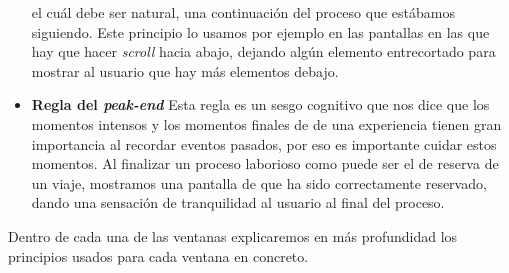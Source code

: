 \begin{itemize}
            el cuál debe ser natural, una continuación del proceso que estábamos siguiendo. Este principio lo usamos por ejemplo en las pantallas en las que hay que hacer \textit{scroll} hacia abajo,
            dejando algún elemento entrecortado para mostrar al usuario que hay más elementos debajo.
      \item \textbf{Regla del \textit{peak-end}} Esta regla es un sesgo cognitivo que nos dice que los momentos intensos y los momentos finales de
            de una experiencia tienen gran importancia al recordar eventos pasados, por eso es importante cuidar estos momentos. Al finalizar un proceso laborioso como
            puede ser el de reserva de un viaje, mostramos una pantalla de que ha sido correctamente reservado, dando una sensación de tranquilidad al usuario
            al final del proceso.

\end{itemize}

Dentro de cada una de las ventanas explicaremos en más profundidad los principios usados para cada ventana en concreto.